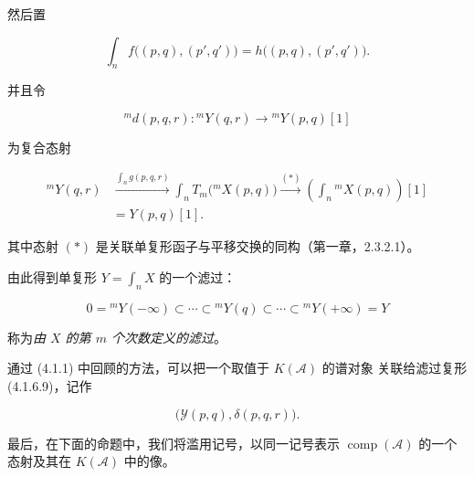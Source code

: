 \clearpage
{}%
\begingroup\small\setlength{\parskip}{0pt}\setlength{\emergencystretch}{1.5em}
\setlength{\abovedisplayskip}{4pt plus 2pt minus 2pt}%
\setlength{\belowdisplayskip}{4pt plus 2pt minus 2pt}%

\noindent 然后置

\begin{equation}
\int_n f\bigl((p,q),(p',q')\bigr)
=h\bigl((p,q),(p',q')\bigr).
\tag{4.1.6.6}
\end{equation}

并且令

\begin{equation}
{}^{m}\!d(p,q,r)\colon{}^{m}\!Y(q,r)
\longrightarrow{}^{m}\!Y(p,q)[1]
\tag{4.1.6.7}
\end{equation}

为复合态射

\begin{equation}
\begin{aligned}
{}^{m}\!Y(q,r)
&\xrightarrow{\int_n g(p,q,r)}
\int_n T_m\bigl({}^{m}\!X(p,q)\bigr)
\xrightarrow{(*)}
\left(\int_n{}^{m}\!X(p,q)\right)[1]\\
&=Y(p,q)[1].
\end{aligned}
\tag{4.1.6.8}
\end{equation}

其中态射 $(*)$ 是关联单复形函子与平移交换的同构（第一章，2.3.2.1）。

由此得到单复形 $Y=\int_n X$ 的一个滤过：

\begin{equation}
0={}^{m}\!Y(-\infty)\subset\cdots\subset{}^{m}\!Y(q)
\subset\cdots\subset{}^{m}\!Y(+\infty)=Y
\tag{4.1.6.9}
\end{equation}

称为\emph{由 $X$ 的第 $m$ 个次数定义的滤过}。

通过 (4.1.1) 中回顾的方法，可以把一个取值于 $K(\mathcal A)$ 的谱对象
关联给滤过复形 (4.1.6.9)，记作

\begin{equation}
\bigl(\mathcal Y(p,q),\delta(p,q,r)\bigr).
\tag{4.1.6.10}
\end{equation}

最后，在下面的命题中，我们将滥用记号，以同一记号表示
$\operatorname{comp}(\mathcal A)$ 的一个态射及其在 $K(\mathcal A)$ 中的像。


